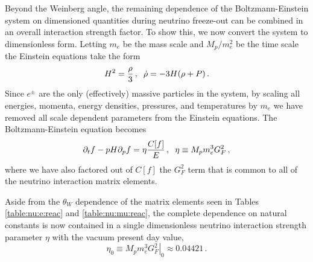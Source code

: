 Beyond the Weinberg angle, the remaining dependence of the Boltzmann-Einstein system on dimensioned quantities during  neutrino freeze-out  can be combined in an overall interaction strength factor.   To show this, we now convert the system  to dimensionless form. Letting $m_e$ be the mass scale and $M_p/m_e^2$ be the time scale the Einstein equations take the form
\begin{equation}
H^2=\frac{\rho}{3}\,,\hspace{2mm}\dot\rho=-3H(\rho+P)\,.
\end{equation}
 Since $e^\pm$ are the only (effectively) massive particles in the system, by scaling all energies, momenta, energy densities, pressures, and temperatures by $m_e$ we have removed all scale dependent parameters from the Einstein equations.  The Boltzmann-Einstein equation becomes
\begin{equation}\label{eta_def}
\partial_tf-pH\partial_pf=\eta\frac{C[f]}{E}\,,\hspace{2mm}\eta\equiv M_p m_e^3G_F^2\,,
\end{equation}
where we have also factored out of $C[f]$ the $G_F^2$ term that is common to all of the neutrino interaction matrix elements. 

Aside from the $\theta_W$ dependence of the matrix elements seen in Tables \ref{table:nu:e:reac} and \ref{table:nu:mu:reac}, the complete dependence on natural constants  is now contained in a single dimensionless neutrino interaction strength parameter $\eta$ with the vacuum present day value,
\begin{equation}\label{eta0_def}
\eta_0\equiv \left.M_p m_e^3 G_F^2\right|_0  \approx 0.04421\, .
\end{equation}


